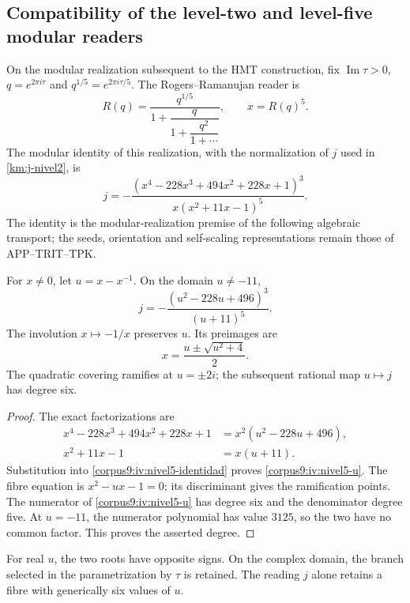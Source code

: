 \subsection{Compatibility of the level-two and level-five modular readers}
\label{corpus9:iv:niveles}

On the modular realization subsequent to the HMT construction,
fix \(\operatorname{Im}\tau>0\), \(q=e^{2\pi i\tau}\) and
\(q^{1/5}=e^{2\pi i\tau/5}\). The Rogers--Ramanujan reader is
\[
 R(q)=\frac{q^{1/5}}{1+\dfrac{q}{1+\dfrac{q^2}{1+\cdots}}},
 \qquad x=R(q)^5.
\]
The modular identity of this realization, with the normalization
of \(j\) used in \eqref{km:j-nivel2}, is
\begin{equation}
 j=-\frac{(x^4-228x^3+494x^2+228x+1)^3}
          {x(x^2+11x-1)^5}.
 \label{corpus9:iv:nivel5-identidad}
\end{equation}
The identity is the modular-realization premise of the
following algebraic transport; the seeds, orientation and
self-scaling representations remain those of APP--TRIT--TPK.

\begin{proposition}
\label{corpus9:iv:nivel5-cociente}
For \(x\ne0\), let \(u=x-x^{-1}\). On the domain \(u\ne-11\),
\begin{equation}
 j=-\frac{(u^2-228u+496)^3}{(u+11)^5}.
 \label{corpus9:iv:nivel5-u}
\end{equation}
The involution \(x\mapsto-1/x\) preserves \(u\). Its preimages are
\[
 x=\frac{u\pm\sqrt{u^2+4}}2.
\]
The quadratic covering ramifies at \(u=\pm2i\); the
subsequent rational map \(u\mapsto j\) has degree six.
\end{proposition}
\begin{proof}
The exact factorizations are
\[
 \begin{aligned}
 x^4-228x^3+494x^2+228x+1
   &=x^2(u^2-228u+496),\\
 x^2+11x-1&=x(u+11).
 \end{aligned}
\]
Substitution into \eqref{corpus9:iv:nivel5-identidad} proves
\eqref{corpus9:iv:nivel5-u}. The fibre equation is
\(x^2-ux-1=0\); its discriminant gives the ramification points.
The numerator of \eqref{corpus9:iv:nivel5-u} has degree six
and the denominator degree five. At \(u=-11\), the
numerator polynomial has value \(3125\), so the two have
no common factor. This proves the asserted degree.
\end{proof}

For real \(u\), the two roots have opposite signs. On the
complex domain, the branch selected in the parametrization
by \(\tau\) is retained. The reading \(j\) alone retains a
fibre with generically six values of \(u\).

